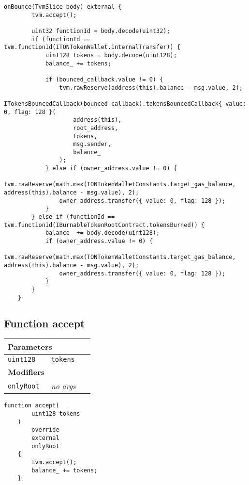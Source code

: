 \vspace{2cm}

\begin{lstlisting}[firstnumber=653]
    onBounce(TvmSlice body) external {
        tvm.accept();

        uint32 functionId = body.decode(uint32);
        if (functionId == tvm.functionId(ITONTokenWallet.internalTransfer)) {
            uint128 tokens = body.decode(uint128);
            balance_ += tokens;

            if (bounced_callback.value != 0) {
                tvm.rawReserve(address(this).balance - msg.value, 2);
                ITokensBouncedCallback(bounced_callback).tokensBouncedCallback{ value: 0, flag: 128 }(
                    address(this),
                    root_address,
                    tokens,
                    msg.sender,
                    balance_
                );
            } else if (owner_address.value != 0) {
                tvm.rawReserve(math.max(TONTokenWalletConstants.target_gas_balance, address(this).balance - msg.value), 2);
                owner_address.transfer({ value: 0, flag: 128 });
            }
        } else if (functionId == tvm.functionId(IBurnableTokenRootContract.tokensBurned)) {
            balance_ += body.decode(uint128);
            if (owner_address.value != 0) {
                tvm.rawReserve(math.max(TONTokenWalletConstants.target_gas_balance, address(this).balance - msg.value), 2);
                owner_address.transfer({ value: 0, flag: 128 });
            }
        }
    }
\end{lstlisting}

\subsection{Function accept}


\ifsoltables
\noindent\begin{tabular}{|l|l|p{5cm}|}\hline
\multicolumn{3}{|l|}{\bf Parameters}\\\hline
\tt uint128 & \tt tokens &\\\hline
\multicolumn{3}{|l|}{\bf Modifiers}\\\hline
\tt onlyRoot & {\em no args} &\\\hline
\end{tabular}
\fi

\vspace{2cm}

\begin{lstlisting}[firstnumber=96]
    function accept(
        uint128 tokens
    )
        override
        external
        onlyRoot
    {
        tvm.accept();
        balance_ += tokens;
    }
\end{lstlisting}

